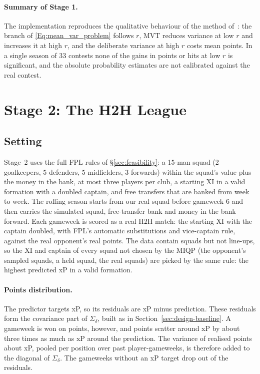 \documentclass[12pt,oneside,a4paper]{book}
\theoremstyle{definition}
\theoremstyle{remark}
\begin{document}
	\paragraph{Summary of Stage 1.} The implementation reproduces the qualitative behaviour of the
	method of~\cite{haugh2021play}: the branch of \eqref{Eq:mean_var_problem} follows $r$, MVT reduces variance at low $r$
	and increases it at high $r$, and the deliberate variance at high $r$ costs mean points. In a
	single season of 33 contests none of the gains in points or hits at low $r$ is significant,
	and the absolute probability estimates are not calibrated against the real contest.

	\section{Stage 2: The H2H League}
	\label{sec:s2}

	\subsection{Setting}
	\label{sec:s2-setting}

	Stage~2 uses the full FPL rules of \S\ref{sec:feasibility}: a 15-man squad (2 goalkeepers, 5 defenders, 5
	midfielders, 3 forwards) within the squad's value plus the money in the bank, at most three
	players per club, a starting XI in a valid formation with a doubled captain, and free transfers
	that are banked from week to week. The rolling season starts from our real squad before
	gameweek 6 and then carries the simulated squad, free-transfer bank and money in the bank
	forward. Each gameweek is scored as a real H2H match: the starting XI with the captain doubled,
	with FPL's automatic substitutions and vice-captain rule, against the real opponent's real
	points. The data contain squads but not line-ups, so the XI and captain of every squad not
	chosen by the MIQP (the opponent's sampled squads, a held squad, the real squads) are picked by
	the same rule: the highest predicted xP in a valid formation.

	\paragraph{Points distribution.} The predictor targets xP, so its residuals are xP minus
	prediction. These residuals form the covariance part of $\Sigma_\delta$, built as in
	Section~\ref{sec:design-baseline}. A gameweek is won on points, however, and points scatter
	around xP by about three times as much as xP around the prediction. The variance of realised
	points about xP, pooled per position over past player-gameweeks, is therefore added to the
	diagonal of $\Sigma_\delta$. The gameweeks without an xP target drop out of the residuals.
\end{document}
